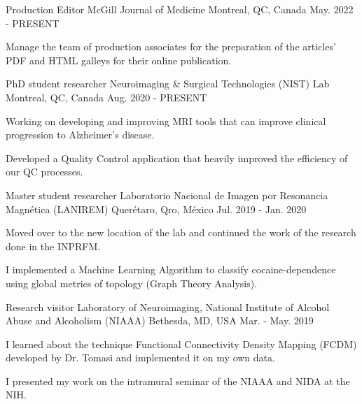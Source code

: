 \vspace{-3.2mm}
\vspace{-1.5mm}
\begin{cventries}
    \cventry
        {Production Editor}
        {McGill Journal of Medicine}
        {Montreal, QC, Canada}
        {May. 2022 - PRESENT}
        {
            \begin{cvitems}
                \item {Manage the team of production associates for the
                    preparation of the articles' PDF and HTML galleys for
                    their online publication.}
            \end{cvitems}
        }
    \cventry
        {PhD student researcher}
        {Neuroimaging \& Surgical Technologies (NIST) Lab}
        {Montreal, QC, Canada}
        {Aug. 2020 - PRESENT}
        {
            \begin{cvitems}
                \item {Working on developing and improving MRI tools that can improve clinical progression to Alzheimer's disease.}
                \item {Developed a Quality Control application that heavily improved the efficiency of our QC processes.}
            \end{cvitems}
        }
    \cventry
        {Master student researcher}
        {Laboratorio Nacional de Imagen por Resonancia Magnética (LANIREM)}
        {Querétaro, Qro, México}
        {Jul. 2019 - Jan. 2020}
        {
            \begin{cvitems}
                \item {Moved over to the new location of the lab and continued the work of the research done in the INPRFM.}
                \item {I implemented a Machine Learning Algorithm to classify cocaine-dependence using global metrics of topology (Graph Theory Analysis).}
            \end{cvitems}
        }
    \cventry
        {Research visitor}
        {Laboratory of Neuroimaging, National Institute of Alcohol Abuse and
        Alcoholism (NIAAA)}
        {Bethesda, MD, USA}
        {Mar. - May. 2019}
        {
            \begin{cvitems}
                \item {I learned about the technique Functional Connectivity Density Mapping (FCDM) developed by Dr. Tomasi and implemented it on my own data.}
                \item {I presented my work on the intramural seminar of the NIAAA and NIDA at the NIH.}

\end{cvitems}}
\end{cventries}

